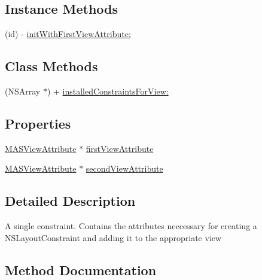 \subsection*{Instance Methods}
\begin{DoxyCompactItemize}
\item 
(id) -\/ \mbox{\hyperlink{interface_m_a_s_view_constraint_ad5d75b0555e99b6ea8ad2d9ca682e108}{init\+With\+First\+View\+Attribute\+:}}
\end{DoxyCompactItemize}
\subsection*{Class Methods}
\begin{DoxyCompactItemize}
\item 
(N\+S\+Array $\ast$) + \mbox{\hyperlink{interface_m_a_s_view_constraint_a947764dff6608eefae24c46f6c21ed4e}{installed\+Constraints\+For\+View\+:}}
\end{DoxyCompactItemize}
\subsection*{Properties}
\begin{DoxyCompactItemize}
\item 
\mbox{\hyperlink{interface_m_a_s_view_attribute}{M\+A\+S\+View\+Attribute}} $\ast$ \mbox{\hyperlink{interface_m_a_s_view_constraint_a3185acee333665120fdc4700329aabc2}{first\+View\+Attribute}}
\item 
\mbox{\hyperlink{interface_m_a_s_view_attribute}{M\+A\+S\+View\+Attribute}} $\ast$ \mbox{\hyperlink{interface_m_a_s_view_constraint_ad7c676556759c8787c84d5b51b4d6692}{second\+View\+Attribute}}
\end{DoxyCompactItemize}


\subsection{Detailed Description}
A single constraint. Contains the attributes neccessary for creating a N\+S\+Layout\+Constraint and adding it to the appropriate view 

\subsection{Method Documentation}
\mbox{\label{interface_m_a_s_view_constraint_ad5d75b0555e99b6ea8ad2d9ca682e108}} 

